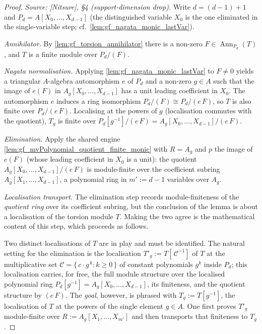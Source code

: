 \begin{proof}

\leanok
  \textit{Source: [Nitsure], \S4 (support-dimension drop).}
  Write \(d = (d-1) + 1\) and \(P_d = A[X_0, \dots, X_{d-1}]\) (the distinguished variable
  \(X_0\) is the one eliminated in the single-variable step; cf.\ \cref{lem:gf_nagata_monic_lastVar}).

  \emph{Annihilator.} By \cref{lem:gf_torsion_annihilator} there is a non-zero
  \(F \in \operatorname{Ann}_{P_d}(T)\), and \(T\) is a finite module over \(P_d/(F)\).

  \emph{Nagata normalisation.} Applying \cref{lem:gf_nagata_monic_lastVar} to \(F \ne 0\)
  yields a triangular \(A\)-algebra automorphism \(e\) of \(P_d\) and a non-zero
  \(g \in A\) such that the image of \(e(F)\) in \(A_g[X_0, \dots, X_{d-1}]\) has a unit
  leading coefficient in \(X_0\). The automorphism \(e\) induces a ring isomorphism
  \(P_d/(F) \cong P_d/(e\,F)\), so \(T\) is also finite over \(P_d/(e\,F)\). Localising at
  the powers of \(g\) (localisation commutes with the quotient), \(T_g\) is finite over
  \(P_d[g^{-1}]/(e\,F) = A_g[X_0, \dots, X_{d-1}]/(e\,F)\).

  \emph{Elimination.} Apply the shared engine
  \cref{lem:gf_mvPolynomial_quotient_finite_monic} with \(R = A_g\) and \(p\) the image of
  \(e(F)\) (whose leading coefficient in \(X_0\) is a unit): the quotient
  \(A_g[X_0, \dots, X_{d-1}]/(e\,F)\) is module-finite over the coefficient subring
  \(A_g[X_1, \dots, X_{d-1}]\), a polynomial ring in \(m' := d - 1\) variables over
  \(A_g\).

  \emph{Localisation transport.} The elimination step records module-finiteness of the
  \emph{quotient ring} over its coefficient subring, but the conclusion of the lemma is
  about a localisation of the torsion module \(T\). Making the two agree is the
  mathematical content of this step, which proceeds as follows.

  Two distinct localisations of \(T\) are in play and must be identified. The natural
  setting for the elimination is the localisation \(T'_g := T[\,\mathcal{C}^{-1}]\) of \(T\)
  at the multiplicative set \(\mathcal{C} = \{\,c \cdot g^{\,k} : k \ge 0\,\}\) of constant
  polynomials \(g^k\) inside \(P_d\); this localisation carries, for free, the full
  module structure over the localised polynomial ring
  \(P_d[g^{-1}] = A_g[X_0, \dots, X_{d-1}]\), its finiteness, and the quotient structure by
  \((e\,F)\). The \emph{goal}, however, is phrased with \(T_g := T[g^{-1}]\), the
  localisation of \(T\) at the powers of the single element \(g \in A\). One first proves
  \(T'_g\) module-finite over \(R := A_g[X_1, \dots, X_{m'}]\) and then transports that
  finiteness to \(T_g\).


\end{proof}
